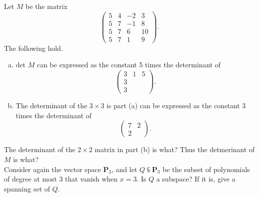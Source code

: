 \documentclass[a4paper,11pt]{article}
\newcommand{\PP}{\mathbf{P}}
\begin{document}
 Let $M$ be the matrix
\[
  \left(
    \begin{array}{rrrr}
      5 & 4 & -2 & 3 \\
      5 & 7 & -1 & 8 \\
      5 & 7 & 6 & 10 \\
      5 & 7 & 1 & 9
    \end{array}
  \right).
\]
The following hold.
\begin{enumerate}[(a)]
\item $\text{det }M$ can be expressed as the constant 5 times the determinant of
  \[
    \left(
      \begin{array}{rrr}
        3 & 1 & 5 \\
        3 & & \\
        3 & & 
      \end{array}
    \right).
  \]
\item The determinant of the $3 \times 3$ is part (a) can be expressed as the
  constant 3 times the determinant of
  \[
    \left(
      \begin{array}{rr}
        7 & 2 \\
        2 &
      \end{array}
    \right).
  \]
\end{enumerate}
The determinant of the $2 \times 2$ matrix in part (b) is what? Thus the
detmerinant of $M$ is what? \\

 Consider again the vector space $\PP_3$, and let
$Q \subseteqq \PP_3$ be the subset of polynomials of degree at most 3 that
vanish when $x=3$. Is $Q$ a subspace? If it is, give a spanning set of $Q$. \\
\end{document}
